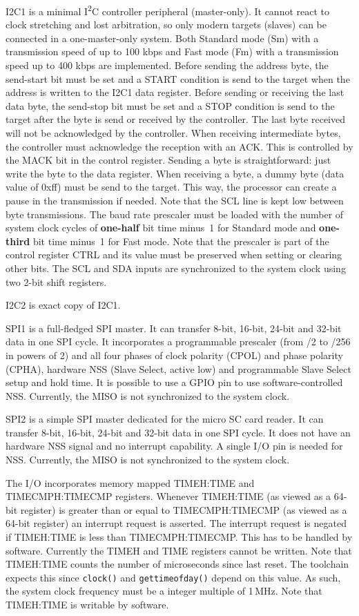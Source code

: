 \documentclass[12pt]{article}
\begin{document}
I2C1 is a minimal I\textsuperscript{2}C controller peripheral (master-only). It cannot react to clock stretching and lost arbitration, so only modern targets (slaves) can be connected in a one-master-only system. Both Standard mode (Sm) with a transmission speed of up to 100 kbps and Fast mode (Fm) with a transmission speed up to 400 kbps are implemented. Before sending the address byte, the send-start bit must be set and a START condition is send to the target when the address is written to the I2C1 data register. Before sending or receiving the last data byte, the send-stop bit must be set and a STOP condition is send to the target after the byte is send or received by the controller. The last byte received will not be acknowledged by the controller. When receiving intermediate bytes, the controller must acknowledge the reception with an ACK. This is controlled by the MACK bit in the control register. Sending a byte is straightforward: just write the byte to the data register. When receiving a byte, a dummy byte (data value of 0xff) must be send to the target. This way, the processor can create a pause in the transmission if needed. Note that the SCL line is kept low between byte transmissions. The baud rate prescaler must be loaded with the number of system clock cycles of \textbf{one-half} bit time minus~1 for Standard mode and \textbf{one-third} bit time minus~1 for Fast mode. Note that the prescaler is part of the control register CTRL and its value must be preserved when setting or clearing other bits. The SCL and SDA inputs are synchronized to the system clock using two 2-bit shift registers.

I2C2 is exact copy of I2C1.

SPI1 is a full-fledged SPI master. It can transfer 8-bit, 16-bit, 24-bit and 32-bit data in one SPI cycle. It incorporates a programmable prescaler (from /2 to /256 in powers of 2) and all four phases of clock polarity (CPOL) and phase polarity (CPHA), hardware NSS (Slave Select, active low) and programmable Slave Select setup and hold time. It is possible to use a GPIO pin to use software-controlled NSS. Currently, the MISO is not synchronized to the system clock.

SPI2 is a simple SPI master dedicated for the micro SC card reader. It can transfer 8-bit, 16-bit, 24-bit and 32-bit data in one SPI cycle. It does not have an hardware NSS signal and no interrupt capability. A single I/O pin is needed for NSS. Currently, the MISO is not synchronized to the system clock.

The I/O incorporates memory mapped TIMEH:TIME and TIMECMPH:TIMECMP registers. Whenever TIMEH:TIME (as viewed as a 64-bit register) is greater than or equal to TIMECMPH:TIMECMP (as viewed as a 64-bit register) an interrupt request is asserted. The interrupt request is negated if TIMEH:TIME is less than TIMECMPH:TIMECMP. This has to be handled by software. Currently the TIMEH and TIME registers cannot be written. Note that TIMEH:TIME counts the number of microseconds since last reset. The toolchain expects this since \lstinline|clock()| and \lstinline|gettimeofday()| depend on this value. As such, the system clock frequency must be a integer multiple of 1\,MHz. Note that TIMEH:TIME is writable by software.
\end{document}

